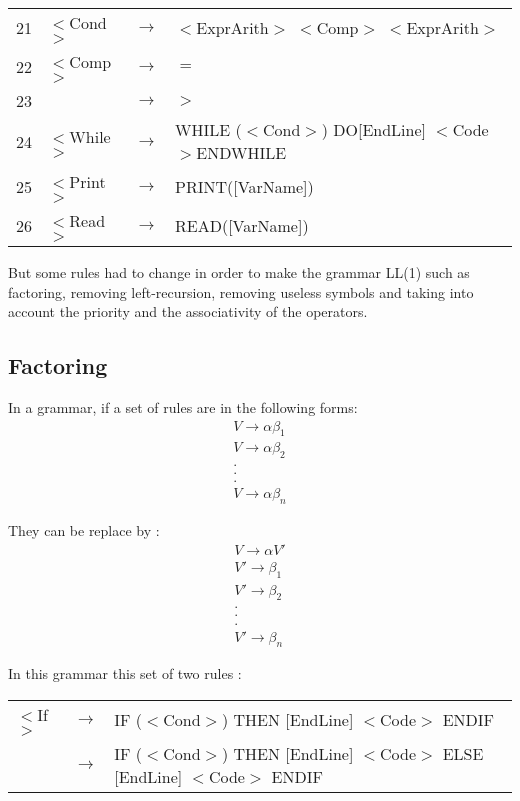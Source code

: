\documentclass{article}
\begin{document}
\begin{center}
\begin{tabular}{|m{0.5cm} m{2cm} m{0.5cm} m{10cm}|}
21 & $<$Cond$>$ & $\to$ & $<$ExprArith$>$ $<$Comp$>$ $<$ExprArith$>$\\

22 & $<$Comp$>$ & $\to$ & $=$\\

23 & & $\to$ & $>$\\

24 & $<$While$>$ & $\to$ & WHILE ($<$Cond$>$) DO[EndLine] $<$Code$>$ENDWHILE\\

25 & $<$Print$>$ & $\to$ & PRINT([VarName])\\

26 & $<$Read$>$ & $\to$ & READ([VarName])\\

\hline
\end{tabular}
\end{center}

\noindent But some rules had to change in order to make the grammar LL(1) such as factoring, removing left-recursion, removing useless symbols and taking into account the priority and the associativity of the operators.

\subsection{Factoring}
In a grammar, if a set of rules are in the following forms:
\[
\begin{array}{c}
V \to \alpha \beta_1 \\
V \to \alpha \beta_2 \\
. \\
. \\
. \\
V \to \alpha \beta_n
\end{array}
\]

\noindent They can be replace by :
\[
\begin{array}{c}
V \to \alpha V' \\
V' \to \beta_1 \\
V' \to \beta_2 \\
. \\
. \\
. \\
V' \to \beta_n
\end{array}
\]

\noindent In this grammar this set of two rules :
\begin{center}
\begin{tabular}{|m{1cm} m{0.5cm} m{10cm}|}
\hline
$<$If$>$ & $\to$ & IF ($<$Cond$>$) THEN [EndLine] $<$Code$>$ ENDIF\\
& $\to$ & IF ($<$Cond$>$) THEN [EndLine] $<$Code$>$ ELSE [EndLine] $<$Code$>$ ENDIF\\
\hline
\end{tabular}
\end{center}
\end{document}
